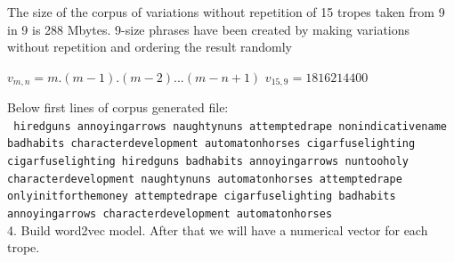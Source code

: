 \documentclass[letterpaper]{article}
\begin{document}
	The size of the corpus of variations without repetition of 15 tropes taken from 9 in 9 is 288 Mbytes. 9-size phrases have been created by making variations without repetition and ordering the result randomly \\
	
	\begin{center}
		
		${v}_{m,n} = m.(m-1).(m-2)...(m-n+1)$
		${v}_{15,9} = 1816214400$
		
	\end{center}
	
	Below first lines of corpus generated file:\\
	\texttt{    
		hiredguns annoyingarrows naughtynuns attemptedrape nonindicativename badhabits characterdevelopment automatonhorses cigarfuselighting    cigarfuselighting hiredguns badhabits annoyingarrows nuntooholy characterdevelopment naughtynuns automatonhorses attemptedrape    onlyinitforthemoney attemptedrape cigarfuselighting badhabits annoyingarrows characterdevelopment automatonhorses }\\
	
	
	
	
	4. Build word2vec model. After that we will have a numerical vector for each trope. \\
	
	   
\end{document}
